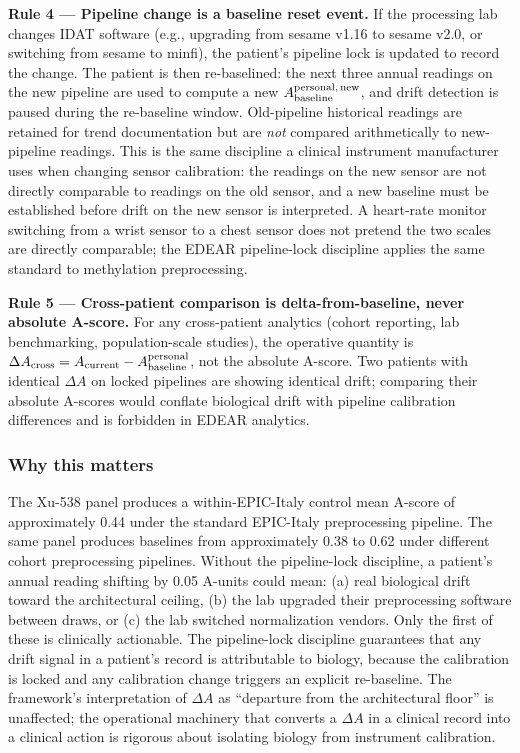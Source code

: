 \documentclass[12pt,a4paper]{article}
\begin{document}
\textbf{Rule 4 --- Pipeline change is a baseline reset event.} If the
processing lab changes IDAT software (e.g., upgrading from sesame
v1.16 to sesame v2.0, or switching from sesame to minfi), the
patient's pipeline lock is updated to record the change. The patient
is then re-baselined: the next three annual readings on the new
pipeline are used to compute a new
$A_{\rm baseline}^{\rm personal,\,new}$, and drift detection is paused
during the re-baseline window. Old-pipeline historical readings are
retained for trend documentation but are \emph{not} compared
arithmetically to new-pipeline readings. This is the same discipline a
clinical instrument manufacturer uses when changing sensor
calibration: the readings on the new sensor are not directly
comparable to readings on the old sensor, and a new baseline must be
established before drift on the new sensor is interpreted. A heart-rate
monitor switching from a wrist sensor to a chest sensor does not pretend
the two scales are directly comparable; the EDEAR pipeline-lock
discipline applies the same standard to methylation preprocessing.

\textbf{Rule 5 --- Cross-patient comparison is delta-from-baseline,
never absolute A-score.} For any cross-patient analytics (cohort
reporting, lab benchmarking, population-scale studies), the operative
quantity is
$\Delta A_{\rm cross} = A_{\rm current} - A_{\rm baseline}^{\rm personal}$,
not the absolute A-score. Two patients with identical $\Delta A$ on
locked pipelines are showing identical drift; comparing their absolute
A-scores would conflate biological drift with pipeline calibration
differences and is forbidden in EDEAR analytics.

\subsubsection{Why this matters}

The Xu-538 panel produces a within-EPIC-Italy control mean A-score of
approximately 0.44 under the standard EPIC-Italy preprocessing
pipeline. The same panel produces baselines from approximately 0.38 to
0.62 under different cohort preprocessing pipelines. Without the
pipeline-lock discipline, a patient's annual reading shifting by 0.05
A-units could mean: (a) real biological drift toward the architectural
ceiling, (b) the lab upgraded their preprocessing software between
draws, or (c) the lab switched normalization vendors. Only the first
of these is clinically actionable. The pipeline-lock discipline
guarantees that any drift signal in a patient's record is attributable
to biology, because the calibration is locked and any calibration
change triggers an explicit re-baseline. The framework's
interpretation of $\Delta A$ as ``departure from the architectural
floor'' is unaffected; the operational machinery that converts a
$\Delta A$ in a clinical record into a clinical action is rigorous
about isolating biology from instrument calibration.
\end{document}
